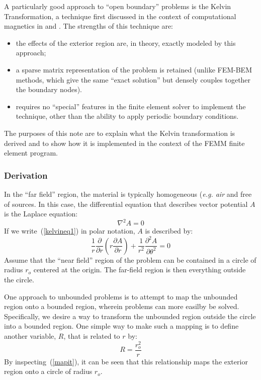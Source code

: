 \documentclass[12pt]{report}
\begin{document}
A particularly good approach to ``open boundary'' problems is the
Kelvin Transformation, a technique first discussed in the context
of computational magnetics in \cite{LowFree} and \cite{LowFreeFor}.
The strengths of this technique are:
\begin{itemize}
\item the effects of the exterior region are, in theory, exactly
modeled by this approach;
\item a sparse matrix representation of the problem is retained
(unlike FEM-BEM methods, which give the same ``exact solution'' but
densely couples together the boundary nodes).
\item requires no ``special'' features in the finite element
solver to implement the technique, other than the ability to apply
periodic boundary conditions.
\end{itemize}
The purposes of this note are to explain what the Kelvin
transformation is derived and to show how it is implemented in the
context of the FEMM finite element program.

\subsubsection{Derivation}

In the ``far field'' region, the material is typically homogeneous
({\em e.g. air} and free of sources.  In this case, the
differential equation that describes vector potential $A$ is the
Laplace equation:
\begin{equation} \label{kelvineq1}
\nabla^2 A = 0
\end{equation}
If we write~(\ref{kelvineq1}) in polar notation, $A$ is described by:
\begin{equation}
\frac{1}{r} \frac{\partial}{\partial r} \left( r \frac{\partial
A}{\partial r} \right) + \frac{1}{r^2} \frac{\partial^2 A}{\partial
\theta^2} = 0
\end{equation}
Assume that the ``near field'' region of the problem can be
contained in a circle of radius $r_o$ centered at the origin.  The
far-field region is then everything outside the circle.

One approach to unbounded problems is to attempt to map the
unbounded region onto a bounded region, wherein problems can more
easilby be solved.  Specifically, we desire a way to transform the
unbounded region outside the circle into a bounded region.  One
simple way to make such a mapping is to define another variable,
$R$, that is related to $r$ by:
\begin{equation} \label{mapit}
R = \frac{r_o^2}{r}
\end{equation}
By inspecting~(\ref{mapit}), it can be seen that this relationship
maps the exterior region onto a circle of radius $r_o$.
\end{document}
